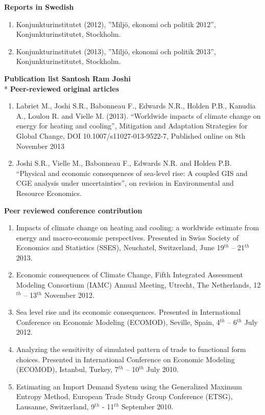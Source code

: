 \textbf{Reports in Swedish}
\begin{enumerate}
	\item Konjunkturinstitutet (2012), ”Miljö, ekonomi och politik 2012”, Konjunkturinstitutet, Stockholm.
	\item Konjunkturinstitutet (2013), ”Miljö, ekonomi och politik 2013”, Konjunkturinstitutet, Stockholm.
\end{enumerate}

\textbf{Publication list Santosh Ram Joshi}\\*
\textbf{Peer-reviewed original articles}
\begin{enumerate}
\item Labriet M., Joshi S.R., Babonneau F., Edwards N.R., Holden P.B., Kanudia A.,  Loulou R. and Vielle M. (2013). “Worldwide impacts of climate change on energy for heating and cooling”, Mitigation and Adaptation Strategies for Global Change, DOI 10.1007/s11027-013-9522-7, Published online on 8th November 2013
\item Joshi S.R., Vielle M., Babonneau F., Edwards N.R. and Holden P.B. “Physical and economic consequences of sea-level rise: A coupled GIS and CGE analysis under uncertainties”, on revision in Environmental and Resource Economics.
\end{enumerate}
\textbf{Peer reviewed conference contribution}
\begin{enumerate}
\item Impacts of climate change on heating and cooling: a worldwide estimate from energy and macro-economic perspectives. Presented in Swiss Society of Economics and Statistics (SSES), Neuchatel, Switzerland, June 19$^{th}$ – 21$^{th}$ 2013.
\item Economic consequences of Climate Change, Fifth Integrated Assessment Modeling Consortium (IAMC) Annual Meeting, Utrecht, The Netherlands, 12$^{th}$ – 13$^{th}$ November 2012.
\item Sea level rise and its economic consequences. Presented in International Conference on Economic Modeling (ECOMOD), Seville, Spain, 4$^{th}$ – 6$^{th}$ July 2012.
\item Analyzing the sensitivity of simulated pattern of trade to functional form choices. Presented in International Conference on Economic Modeling (ECOMOD), Istanbul, Turkey,  7$^{th}$ – 10$^{th}$ July 2010.
\item Estimating an Import Demand System using the Generalized Maximum Entropy Method,
European Trade Study Group Conference (ETSG), Lausanne, Switzerland, 9$^{th}$ - 11$^{th}$ September 2010.
\end{enumerate}
